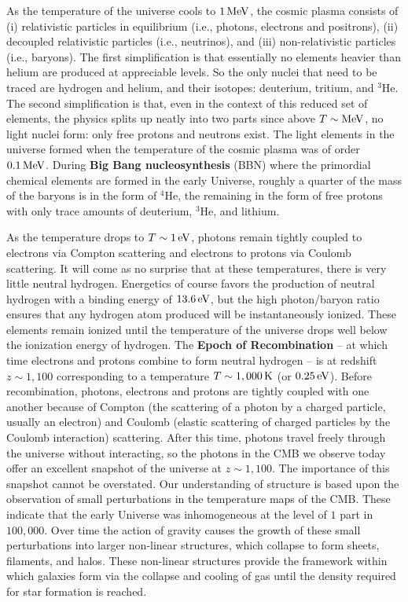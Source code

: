 \documentclass[a4paper,11pt]{article}
\begin{document}
As the temperature of the universe cools to $1\,{\rm MeV}$, the cosmic plasma consists of (i) relativistic particles in equilibrium (i.e., photons, electrons and positrons), (ii) decoupled relativistic particles (i.e., neutrinos), and (iii) non-relativistic particles (i.e., baryons). The first simplification is that essentially no elements heavier than helium are produced at appreciable levels. So the only nuclei that need to be traced are hydrogen and helium, and their isotopes: deuterium, tritium, and $^3$He. The second simplification is that, even in the context of this reduced set of elements, the physics splits up neatly into two parts since above $T\sim\rm{MeV}$, no light nuclei form: only free protons and neutrons exist. The light elements in the universe formed when the temperature of the cosmic plasma was of order $0.1\,{\rm MeV}$. During \textbf{Big Bang nucleosynthesis} (BBN) where the primordial chemical elements are formed in the early Universe, roughly a quarter of the mass of the baryons is in the form of $^4$He, the remaining in the form of free protons with only trace amounts of deuterium, $^3$He, and lithium.

As the temperature drops to $T\sim1\,{\rm eV}$, photons remain tightly coupled to electrons via Compton scattering and electrons to protons via Coulomb scattering. It will come as no surprise that at these temperatures, there is very little neutral hydrogen. Energetics of course favors the production of neutral hydrogen with a binding energy of $13.6\,{\rm eV}$, but the high photon/baryon ratio ensures that any hydrogen atom produced will be instantaneously ionized. These elements remain ionized until the temperature of the universe drops well below the ionization energy of hydrogen. The \textbf{Epoch of Recombination} -- at which time electrons and protons combine to form neutral hydrogen -- is at redshift $z\sim1,100$ corresponding to a temperature $T\sim1,000\,{\rm K}$ (or $0.25\,{\rm eV}$). Before recombination, photons, electrons and protons are tightly coupled with one another because of Compton (the scattering of a photon by a charged particle, usually an electron) and Coulomb (elastic scattering of charged particles by the Coulomb interaction) scattering. After this time, photons travel freely through the universe without interacting, so the photons in the CMB we observe today offer an excellent snapshot of the universe at $z\sim1,100$. The importance of this snapshot cannot be overstated. Our understanding of structure is based upon the observation of small perturbations in the temperature maps of the CMB. These indicate that the early Universe was inhomogeneous at the level of $1$ part in $100,000$. Over time the action of gravity causes the growth of these small perturbations into larger non-linear structures, which collapse to form sheets, filaments, and halos. These non-linear structures provide the framework within which galaxies form via the collapse and cooling of gas until the density required for star formation is reached.
\end{document}
